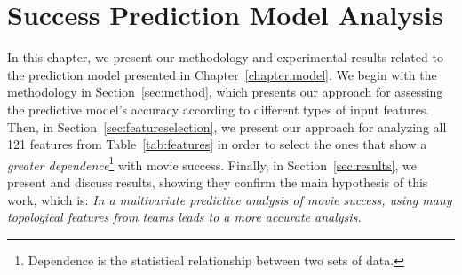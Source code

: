 \chapter{Success Prediction Model Analysis}
\label{chapter:analysis}
In this chapter, we present our methodology and experimental results related to
the prediction model presented in Chapter~\ref{chapter:model}. We begin with
the methodology in Section~\ref{sec:method}, which presents our approach for
assessing the predictive model's accuracy according to different types of input
features. Then, in Section~\ref{sec:featureselection}, we present our approach
for analyzing all 121 features from Table~\ref{tab:features} in order to select
the ones that show a \textit{greater dependence}\footnote{Dependence is the
statistical relationship between two sets of data.} with movie success.
Finally, in Section~\ref{sec:results}, we present and discuss results, showing
they confirm the main hypothesis of this work, which is: \textit{In a
multivariate predictive analysis of movie success, using many topological
features from teams leads to a more accurate analysis.}





